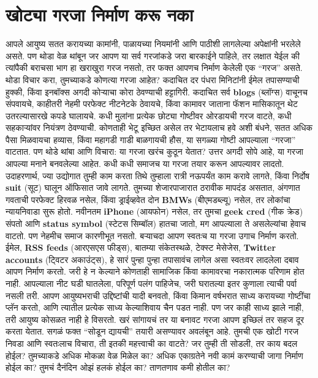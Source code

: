  \chapter{खोट्या गरजा निर्माण करू नका}
आपले आयुष्य सतत करायच्या कामांनी, पाळायच्या नियमांनी आणि पाठीशी लागलेल्या अपेक्षांनी भरलेले असते. पण थोडा वेळ थांबून जर आपण या सर्व गरजांकडे जरा बारकाईने पाहिले, तर लक्षात येईल की त्यांपैकी बराचसा भाग हा खराखुरा गरज नसतो, तर फक्त आपणच निर्माण केलेली एक “गरज” असते.
थोडा विचार करा,  तुमच्याकडे कोणत्या गरजा आहेत? कदाचित दर पंधरा मिनिटांनी ईमेल तपासण्याची हुक्की, किंवा इनबॉक्स अगदी कोऱ्याचा कोरा ठेवण्याची हट्टागिरी. कदाचित सर्व \textbf {blogs} (ब्लॉग्स) वाचूनच संपवायचे, काहीतरी नेहमी परफेक्ट नीटनेटके ठेवायचे, किंवा कामावर जाताना फॅशन मासिकातून थेट उतरल्यासारखे कपडे घालायचे.
 कधी मुलांना प्रत्येक छोट्या गोष्टीवर ओरडायची गरज वाटते, कधी सहकाऱ्यांवर नियंत्रण ठेवण्याची. कोणताही भेटू इच्छित असेल तर भेटायलाच हवे अशी बंधने, सतत अधिक पैसा मिळवायचा हव्यास, किंवा महागडी गाडी बाळगायची हौस,  या सगळ्या गोष्टी आपल्याला “गरजा” वाटतात.
पण थोडे थांबा आणि विचारा: या गरजा खरंच कुठून येतात? उत्तर अगदी सोपे आहे,  या गरजा आपल्या मनाने बनवलेल्या आहेत.
कधी कधी समाजच या गरजा तयार करून आपल्यावर लादतो. उदाहरणार्थ, ज्या उद्योगात तुम्ही काम करता तिथे तुम्हाला रात्री नऊपर्यंत काम करावे लागते, किंवा निर्दोष \textbf {suit} (सूट) घालून ऑफिसात जावे लागते. तुमच्या शेजारपाजारात ठरावीक मापदंड असतात,  अंगणात गवताची परफेक्ट हिरवळ नसेल, किंवा ड्राईव्हवेत दोन \textbf {BMWs} (बीएमडब्ल्यू) नसेल, तर लोकांचा न्यायनिवाडा सुरू होतो. नवीनतम \textbf {iPhone} (आयफोन) नसेल, तर तुमचा \textbf {geek cred} (गीक क्रेड) संपतो आणि \textbf {status symbol} (स्टेटस सिम्बॉल) हातचा जातो,  मग आपल्याला ते असलेल्यांचा हेवाच वाटतो.
पण नेहमीच समाज कारणीभूत नसतो. बऱ्याचदा आपण स्वतःच या गरजा उगाच निर्माण करतो. ईमेल, \textbf {RSS feeds} (आरएसएस फीड्स), बातम्या संकेतस्थळे, टेक्स्ट मेसेजेस, \textbf {Twitter accounts} (ट्विटर अकाउंट्स),  हे सारं पुन्हा पुन्हा तपासावंच लागेल असा स्वतःवर लादलेला दबाव आपण निर्माण करतो. जरी हे न केल्याने कोणताही सामाजिक किंवा कामावरचा नकारात्मक परिणाम होत नाही.
 आपल्याला नीट घडी घातलेला, परिपूर्ण पलंग पाहिजेच, जरी घरातल्या इतर कुणाला त्याची पर्वा नसली तरी. आपण आयुष्यभराची उद्दिष्टांची यादी बनवतो, किंवा किमान वर्षभरात साध्य करायच्या गोष्टींचा प्लॅन करतो,  आणि त्यातील प्रत्येक साध्य केल्याशिवाय चैन पडत नाही. पण जर काही साध्य झाले नाही, तरी आयुष्य कोसळत नाही हे विसरतो.
खरं सांगायचं तर या बनावट गरजा आपण इच्छिलं तर सहज दूर करता येतात. सगळं फक्त “सोडून द्यायची” तयारी असण्यावर अवलंबून आहे.
तुमची एक खोटी गरज निवडा आणि स्वतःलाच विचारा,  ती इतकी महत्त्वाची का वाटते? जर तुम्ही ती सोडली, तर काय बदल होईल? तुमच्याकडे अधिक मोकळा वेळ मिळेल का? अधिक एकाग्रतेने नवी कामं करण्याची जागा निर्माण होईल का? तुमचं दैनंदिन ओझं हलकं होईल का? ताणतणाव कमी होतील का?
